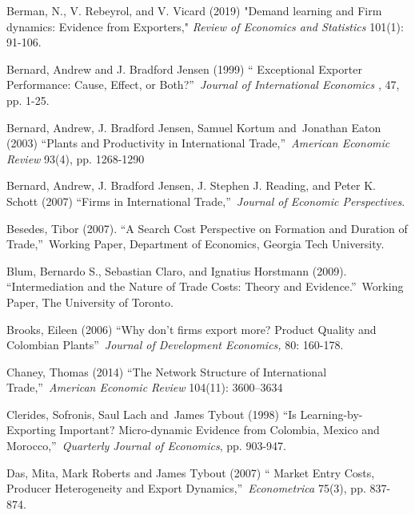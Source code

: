\documentclass[12pt]{article}
\begin{document}
\begin{description}
\item Berman, N., V. Rebeyrol, and V. Vicard (2019) "Demand learning and
Firm dynamics: Evidence from Exporters," \textit{Review of Economics and
Statistics }101(1): 91-106.

\item Bernard, Andrew and J. Bradford Jensen (1999) \textquotedblleft
Exceptional Exporter Performance: Cause, Effect, or Both?\textquotedblright\ 
\textit{Journal of International Economics} , 47, pp. 1-25.

\item Bernard, Andrew, J. Bradford Jensen, Samuel Kortum and\ Jonathan Eaton
(2003) \textquotedblleft Plants and Productivity in International
Trade,\textquotedblright\ \textit{American Economic Review }93(4), pp.
1268-1290

\item Bernard, Andrew, J. Bradford Jensen, J. Stephen J. Reading, and Peter
K. Schott (2007) \textquotedblleft Firms in International
Trade,\textquotedblright\ \textit{Journal of Economic Perspectives}.

\item Besedes, Tibor (2007). \textquotedblleft A Search Cost Perspective on
Formation and Duration of Trade,\textquotedblright\ Working Paper,
Department of Economics, Georgia Tech University.

\item Blum, Bernardo S., Sebastian Claro, and Ignatius Horstmann (2009).
\textquotedblleft Intermediation and the Nature of Trade Costs: Theory and
Evidence.\textquotedblright\ Working Paper, The University of Toronto.

\item Brooks, Eileen (2006) \textquotedblleft Why don't firms export more?
Product Quality and Colombian Plants\textquotedblright\ \textit{Journal of
Development Economics,} 80: 160-178.

\item Chaney, Thomas (2014) \textquotedblleft The Network Structure of
International Trade,\textquotedblright\ \textit{American Economic Review}
104(11): 3600--3634

\item Clerides, Sofronis, Saul Lach and\ James Tybout (1998)
\textquotedblleft Is Learning-by-Exporting Important? Micro-dynamic Evidence
from Colombia, Mexico and Morocco,\textquotedblright\ \textit{Quarterly
Journal of Economics}, pp. 903-947.

\item Das, Mita, Mark Roberts and James Tybout (2007) \textquotedblleft
Market Entry Costs, Producer Heterogeneity and Export
Dynamics,\textquotedblright\ \textit{Econometrica }75(3), pp. 837-874.


\end{description}
\end{document}

